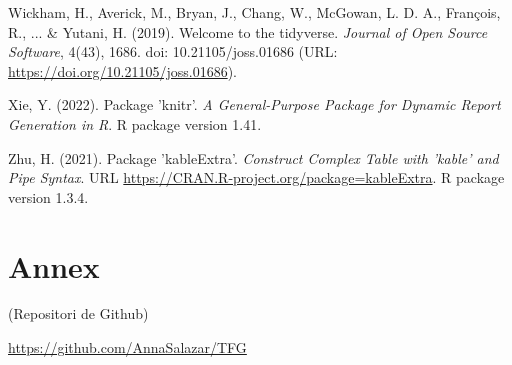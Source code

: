 \documentclass[12pt,longbibliography]{article}
\theoremstyle{definition}
\theoremstyle{remark}
\begin{document}
\begin{thebibliography}{99}
  Wickham, H., Averick, M., Bryan, J., Chang, W., McGowan, L. D. A., François, R., ... \& Yutani, H. (2019). Welcome to the tidyverse. \textit{Journal of Open Source Software}, 4(43), 1686. doi: 10.21105/joss.01686 (URL: \url{https://doi.org/10.21105/joss.01686}).

 Xie, Y. (2022). Package 'knitr'. \textit{A General-Purpose Package for Dynamic Report Generation in R}. R package version 1.41.

 Zhu, H. (2021). Package 'kableExtra'. \textit{Construct Complex Table with 'kable' and Pipe Syntax}. URL \url{https://CRAN.R-project.org/package=kableExtra}. R package version 1.3.4.  

\end{thebibliography} 


\newpage

\section{Annex}

(Repositori de Github)

\url{https://github.com/AnnaSalazar/TFG}





\end{document}
